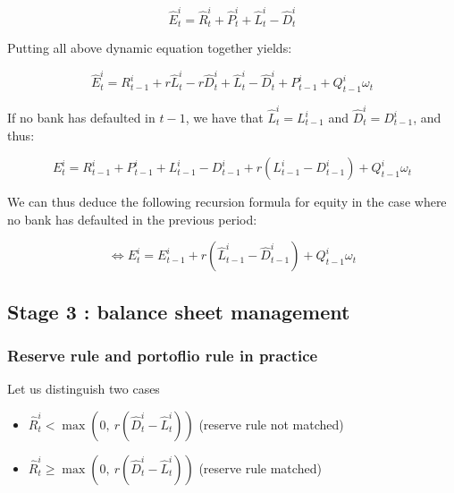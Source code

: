 \documentclass{article}
\newcommand{\wh}{\widehat}
\begin{document}
\begin{equation}\label{eq:eqtdef}
\wh E^i_t = \wh R^i_t + \wh P_t^i + \wh L^i_t - \wh D^i_t
\end{equation}

Putting all above dynamic equation together yields: 


$$ \wh E^i_t = R_{t-1}^i + r \wh L_t^i - r \wh D_t^i + \wh L^i_t - \wh D^i_t + P_{t-1}^i + Q_{t-1}^i \omega_t$$


If no bank has defaulted in $t-1$, we have that $\wh L^i_t = L^i_{t-1}$ and $ \wh D^i_t = D^i_{t-1}$, and thus:


$$E^i_t = R_{t-1}^i + P_{t-1}^{i} + L^i_{t-1} - D^i_{t-1} + r (L_{t-1}^i - D_{t-1}^i) + Q_{t-1}^i \omega_t$$

We can thus deduce the following recursion formula for equity in the case where no bank has defaulted in the previous period: 


\begin{equation}\label{eq:eqtdyna}
\Leftrightarrow E^i_t = E^i_{t-1} + r (\wh L_{t-1}^i - \wh D_{t-1}^i) + Q_{t-1}^i \omega_t
\end{equation}

\subsection{Stage 3 : balance sheet management}\label{balance_sheet_management}

\subsubsection{Reserve rule and portoflio rule in practice}

Let us distinguish two cases

\begin{itemize}
    \item $\widehat{R}_t^i < \max(0,~r(\wh D_t^i - \wh L_t^i))$ (reserve rule not matched)
    \item $\widehat{R}_t^i \geq \max(0,~r(\wh D_t^i - \wh L_t^i))$ (reserve rule matched)
\end{itemize}
\end{document}
